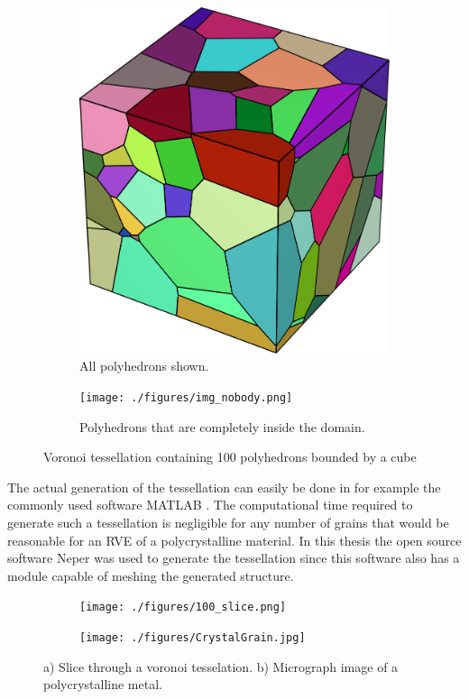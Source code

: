 \documentclass[micro_gen.tex]{subfiles}
\begin{document}
\begin{figure}[htpb!]
\centering
\begin{subfigure}[b]{.5\textwidth}
  \centering
  \includegraphics[width=.5\linewidth]{./figures/img_body.png}
  \caption{All polyhedrons shown.}
  \label{fig:pois_voronoi_a}
\end{subfigure}%
\begin{subfigure}[b]{.5\textwidth}
  \centering
  \texttt{[image: ./figures/img\_nobody.png]}
  \caption{Polyhedrons that are completely inside the domain.}
  \label{fig:pois_voronoi_b}
\end{subfigure}
\caption{Voronoi tessellation containing 100 polyhedrons bounded by a cube}
\label{fig:pois_voronoi}
\end{figure}


 The actual generation of the tessellation can easily be done in for example the commonly used software MATLAB \cite{matlab:voronoi}. The computational time required to generate such a tessellation is negligible for any number of grains that would be reasonable for an RVE of a polycrystalline material. In this thesis the open source software Neper \cite{Quey20111729} was used to generate the tessellation since this software also has a module capable of meshing the generated structure.

\begin{figure}[htpb!]
\centering
\begin{subfigure}[b]{.5\textwidth}
  \centering
  \texttt{[image: ./figures/100\_slice.png]}
  \caption{}
   \label{fig:slice_a}
\end{subfigure}%
\begin{subfigure}[b]{.5\textwidth}
  \centering
  \texttt{[image: ./figures/CrystalGrain.jpg]}
  \caption{}
  \label{fig:slice_b}
\end{subfigure}
\caption{a) Slice through a voronoi tesselation.  b) Micrograph image of a polycrystalline metal.\cite{wiki:grain}}
\label{fig:slice}
\end{figure}
\end{document}
